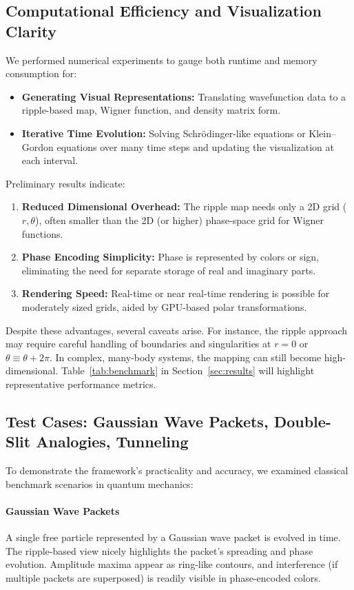 \documentclass[11pt]{article}
\begin{document}
\subsection{Computational Efficiency and Visualization Clarity}
\label{subsec:comp-efficiency}
We performed numerical experiments to gauge both runtime and 
memory consumption for:
\begin{itemize}
  \item \textbf{Generating Visual Representations:} 
    Translating wavefunction data to a ripple-based map, 
    Wigner function, and density matrix form.
  \item \textbf{Iterative Time Evolution:} 
    Solving Schr\"odinger-like equations or Klein--Gordon 
    equations over many time steps and updating the 
    visualization at each interval.
\end{itemize}
Preliminary results indicate:
\begin{enumerate}
  \item \textbf{Reduced Dimensional Overhead:} 
    The ripple map needs only a 2D grid (\(r, \theta\)), 
    often smaller than the 2D (or higher) phase-space 
    grid for Wigner functions.
  \item \textbf{Phase Encoding Simplicity:} 
    Phase is represented by colors or sign, eliminating the 
    need for separate storage of real and imaginary parts.
  \item \textbf{Rendering Speed:} 
    Real-time or near real-time rendering is possible for 
    moderately sized grids, aided by GPU-based 
    polar transformations.
\end{enumerate}
Despite these advantages, several caveats arise. For instance, 
the ripple approach may require careful handling of boundaries 
and singularities at \(r=0\) or \(\theta \equiv \theta + 2\pi\). 
In complex, many-body systems, the mapping can still become 
high-dimensional. Table~\ref{tab:benchmark} in 
Section~\ref{sec:results} will highlight representative 
performance metrics.

\subsection{Test Cases: Gaussian Wave Packets, Double-Slit Analogies, Tunneling}
\label{subsec:test-cases}
To demonstrate the framework’s practicality and accuracy, 
we examined classical benchmark scenarios in quantum mechanics:

\paragraph{Gaussian Wave Packets}
A single free particle represented by a Gaussian wave packet 
is evolved in time. The ripple-based view nicely highlights the 
packet’s spreading and phase evolution. Amplitude maxima appear 
as ring-like contours, and interference (if multiple packets 
are superposed) is readily visible in phase-encoded colors.
\end{document}
